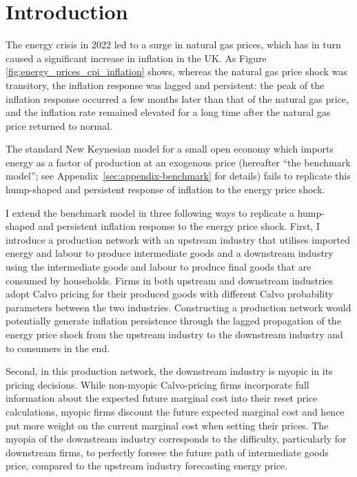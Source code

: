 \documentclass[a4paper, 12pt]{article}
\theoremstyle{definition*}
\begin{document}
\tableofcontents
\listoffigures
\listoftables

\pagebreak \newpage

\onehalfspacing

\section{Introduction}

The energy crisis in 2022 led to a surge in natural gas prices, which has in turn caused a significant increase in inflation in the UK.
As Figure \ref{fig:energy_prices_cpi_inflation} shows, whereas the natural gas price shock was transitory, the inflation response was lagged and persistent: the peak of the inflation response occurred a few months later than that of the natural gas price, and the inflation rate remained elevated for a long time after the natural gas price returned to normal.

The standard New Keynesian model for a small open economy which imports energy as a factor of production at an exogenous price (hereafter ``the benchmark model''; see Appendix~\ref{sec:appendix-benchmark} for details) fails to replicate this hump-shaped and persistent response of inflation to the energy price shock.

I extend the benchmark model in three following ways to replicate a hump-shaped and persistent inflation response to the energy price shock.
First, I introduce a production network with an upstream industry that utilises imported energy and labour to produce intermediate goods and a downstream industry using the intermediate goods and labour to produce final goods that are consumed by households.
Firms in both upstream and downstream industries adopt Calvo pricing for their produced goods with different Calvo probability parameters between the two industries.
Constructing a production network would potentially generate inflation persistence through the lagged propagation of the energy price shock from the upstream industry to the downstream industry and to consumers in the end.

Second, in this production network, the downstream industry is myopic in its pricing decisions.
While non-myopic Calvo-pricing firms incorporate full information about the expected future marginal cost into their reset price calculations, myopic firms discount the future expected marginal cost and hence put more weight on the current marginal cost when setting their prices.
The myopia of the downstream industry corresponds to the difficulty, particularly for downstream firms, to perfectly foresee the future path of intermediate goods price, compared to the upstream industry forecasting energy price.
\end{document}
